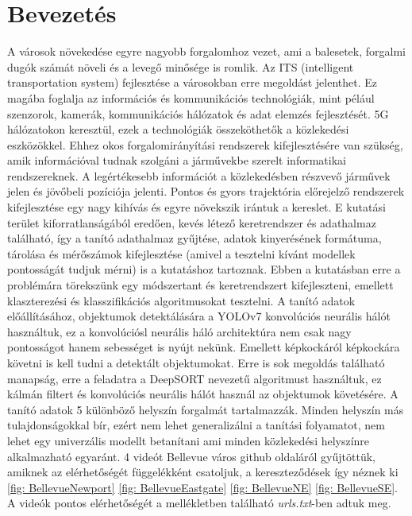 \documentclass[acmtog, authorversion]{acmart}
\begin{document}
\section{Bevezetés}
A városok növekedése egyre nagyobb forgalomhoz vezet, ami a balesetek, forgalmi dugók számát növeli és a levegő minősége is romlik.
Az ITS (intelligent transportation system) fejlesztése a városokban erre megoldást jelenthet. Ez magába foglalja az információs és
kommunikációs technológiák, mint pélául szenzorok, kamerák, kommunikációs hálózatok és adat elemzés fejlesztését. 5G hálózatokon
keresztül, ezek a technológiák összeköthetők a közlekedési eszközökkel. Ehhez okos forgalomirányítási rendszerek kifejlesztésére
van szükség, amik információval tudnak szolgáni a járművekbe szerelt informatikai rendszereknek.
A legértékesebb információt a közlekedésben részvevő járművek jelen és jövőbeli pozíciója jelenti. Pontos és gyors trajektória 
előrejelző rendszerek kifejlesztése egy nagy kihívás és egyre növekszik irántuk a kereslet. E kutatási terület kiforratlanságából
eredően, kevés létező keretrendszer és adathalmaz található, így a tanító adathalmaz gyűjtése, adatok kinyerésének formátuma, tárolása
és mérőszámok kifejlesztése (amivel a tesztelni kívánt modellek pontosságát tudjuk mérni) is a kutatáshoz tartoznak.  
Ebben a kutatásban erre a problémára törekszünk egy módszertant és keretrendszert kifejleszteni, emellett klaszterezési és klasszifikációs
algoritmusokat tesztelni. A tanító adatok előállításához, objektumok detektálására a YOLOv7 \cite{wang2022yolov7}
konvolúciós neurális hálót használtuk, ez a konvolúciósl neurális háló architektúra nem csak nagy pontosságot hanem sebességet is nyújt nekünk. 
Emellett képkockáról képkockára követni is kell tudni a detektált objektumokat. Erre is sok megoldás található manapság, erre a feladatra
a DeepSORT \cite{Wojke2018deep} nevezetű algoritmust használtuk, ez kálmán filtert és konvolúciós neurális hálót használ az objektumok követésére.
A tanító adatok 5 különböző helyszín forgalmát tartalmazzák. Minden helyszín más tulajdonságokkal bír, ezért nem lehet generalizálni
a tanítási folyamatot, nem lehet egy univerzális modellt betanítani ami minden közlekedési helyszínre alkalmazható egyaránt.
4 videót Bellevue város github oldaláról gyűjtöttük, amiknek az elérhetőségét függelékként csatoljuk, a kereszteződések így néznek ki
\ref{fig: BellevueNewport} \ref{fig: BellevueEastgate} \ref{fig: BellevueNE} \ref{fig: BellevueSE}. A videók pontos elérhetőségét
a mellékletben található \emph{urls.txt}-ben adtuk meg.
\end{document}
